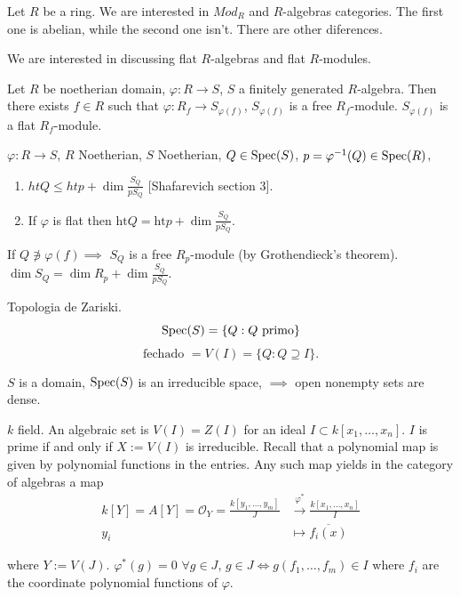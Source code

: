 \noindent
Let $R$ be a ring.
We are interested in $Mod_R$ and $R$-algebras
categories.
The first one is abelian, while the second
one isn't.
There are other diferences.

We are interested in discussing flat
$R$-algebras
and flat $R$-modules.

\begin{theorem}
\label{theorem-grothendieck}
Let $R$ be noetherian domain, $\varphi:R \to
S$,
$S$ a finitely generated $R$-algebra.
Then there exists $f \in R$
such that $\varphi:R_f \to S_{\varphi(f)}$,
$S_{\varphi(f)}$ is a free $R_f$-module.
$S_{\varphi(f)}$ is a flat $R_f$-module.
\end{theorem}

\begin{theorem}
\label{theorem-dimension-of-fibers}
$\varphi:R \to S$, $R$ Noetherian,
$S$ Noetherian, $Q \in \mathop{\mathrm{Spec}}(S)$,
$p=\varphi^{-1}(Q) \in \mathop{\mathrm{Spec}}(R)$,
\begin{enumerate}
\item $ht Q \leq  ht p + \dim
\frac{S_Q}{pS_Q}$
[Shafarevich section 3].
\item If $\varphi$ is flat then
$\text{ht}Q=\text{ht}p+\dim
\frac{S_Q}{pS_Q}$.
\end{enumerate}

\noindent
If $Q \not\ni \varphi(f) \implies $
$S_Q$ is a free $R_p$-module (by
Grothendieck's theorem).
$\dim S_Q= \dim R_p+\dim \frac{S_Q}{p S_Q}$.
\end{theorem}

\noindent
Topologia de Zariski.
$$
\mathop{\mathrm{Spec}}(S)=\{Q:Q \text{ primo}\}
$$
$$
\text{fechado }=V(I)= \{ Q: Q \supseteq I\}.
$$

$S$ is a domain, $\mathop{\mathrm{Spec}}(S)$ is an irreducible
space,
$\implies $ open nonempty sets are dense.


\medskip\noindent
$k$ field. An algebraic set is  $V(I) = Z(I)$
for an ideal
$I \subset k[x_1,…,x_n]$. $I$ is prime if and
only if
$X:=V(I)$ is irreducible.
Recall that a polynomial map is given
by polynomial functions in the entries.
Any such map yields in the category of
algebras a map
$$
\begin{aligned}
k[Y]=A[Y]=\mathcal{O}_Y=\frac{k[y_1,…,y_m]}
{J}
&\xrightarrow{\varphi^*}
\frac{k[x_1,…,x_n]}{I}\\
y_i&\mapsto \overline{f_i(x)}
\end{aligned}
$$

\noindent
where $Y:=V(J)$.
$\varphi^*(g)=0$ $\forall  g \in J$,
$g \in J \iff g(f_1,…,f_m)\in I$
where $f_i$ are the coordinate polynomial
functions of $\varphi$.

